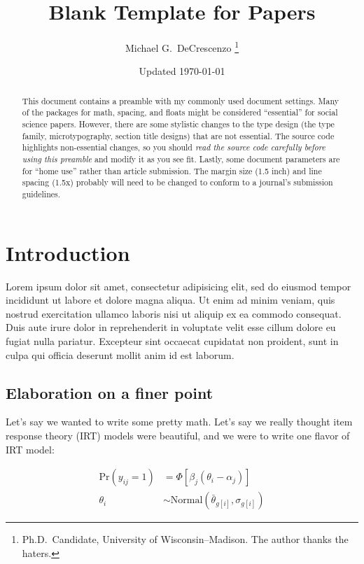 \documentclass[12pt
              ]{article}
\begin{document}
\title{Blank Template for Papers}
\author{Michael G.\ DeCrescenzo%
          \thanks{Ph.D.\ Candidate, University of Wisconsin--Madison. The author thanks the haters.}}
\date{Updated \today}
\maketitle


\begin{abstract}
  This document contains a preamble with my commonly used document settings. Many of the packages for math, spacing, and floats might be considered ``essential'' for social science papers. However, there are some stylistic changes to the type design (the type family, microtypography, section title designs) that are not essential. The source code highlights non-essential changes, so you should \emph{read the source code carefully before using this preamble} and modify it as you see fit. Lastly, some document parameters are for ``home use'' rather than article submission. The margin size (1.5 inch) and line spacing (1.5x) probably will need to be changed to conform to a journal's submission guidelines.
\end{abstract}



\onehalfspacing


\section{Introduction}

Lorem ipsum dolor sit amet, consectetur adipisicing elit, sed do eiusmod
tempor incididunt ut labore et dolore magna aliqua. Ut enim ad minim veniam,
quis nostrud exercitation ullamco laboris nisi ut aliquip ex ea commodo
consequat. Duis aute irure dolor in reprehenderit in voluptate velit esse
cillum dolore eu fugiat nulla pariatur. Excepteur sint occaecat cupidatat non
proident, sunt in culpa qui officia deserunt mollit anim id est laborum.


\subsection{Elaboration on a finer point}

Let's say we wanted to write some pretty math. Let's say we really thought item response theory (IRT) models were beautiful, and we were to write one flavor of IRT model:

\begin{align}
  \mathrm{Pr}\left( y_{ij} = 1 \right)
  &=
  \Phi \left[
    \beta_{j} \left( \theta_{i} - \alpha_{j} \right)
  \right] \\
  \theta_{i} &\sim \mathrm{Normal}\left(\bar{\theta}_{g[i]}, \sigma_{g[i]} \right)
\end{align}


\newpage
\printbibliography
\end{document}
